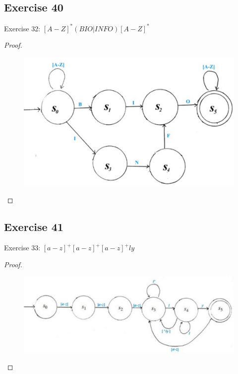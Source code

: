 \documentclass[14pt]{extarticle}
\begin{document}
\subsection{Exercise 40}
Exercise 32: \([A-Z]^*(BIO | INFO)[A-Z]^*\)
\begin{proof}
\begin{figure}[ht!]
\centering
\includegraphics[scale=0.25]{../images/12.2.40.png}
\end{figure}
\end{proof}

\subsection{Exercise 41}
Exercise 33: \([a-z]^+[a-z]^+[a-z]^+ ly\)
\begin{proof}
\begin{figure}[ht!]
\centering
\includegraphics[scale=0.4]{../images/12.2.41.png}
\end{figure}
\end{proof}
\end{document}
